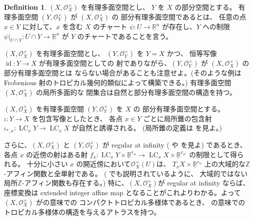 \documentclass[a4paper,dvipdfmx,reqno,12pt]{amsart}
\theoremstyle{definition}
\newtheorem{definition}[theorem]{Definition}
\newcommand{\opn}[1]{\operatorname{#1}}
\numberwithin{equation}{section}
\begin{document}
\begin{definition}

$(X,\mathcal{O}_X^{\times})$ を有理多面空間とし、
$Y$ を $X$ の部分空間とする。
有理多面空間 $(Y,\mathcal{O}_Y^{\times})$ が 
$(X,\mathcal{O}_X^{\times})$ の
部分有理多面空間であるとは、
任意の点 $x\in Y$ に対して、$x$ を含む
$X$ のチャート $\psi \colon U\to \underline{\mathbb{R}}^{n}$
が存在し、$Y$ への制限 
$\psi|_{U\cap Y}\colon U\cap Y \to \underline{\mathbb{R}}^{n}$
が $Y$ のチャートであることを言う。
\end{definition}

$(X,\mathcal{O}_X^{\times})$ を有理多面空間とし、
$(Y,\mathcal{O}_Y^{\times})$ を $Y=X$ かつ、
恒等写像 $\opn{id}\colon Y\to X$ が有理多面空間としての
射でありながら、$(Y,\mathcal{O}_Y^{\times})$ が
$(X,\mathcal{O}_X^{\times})$ の部分有理多面空間とは
ならない場合があることも注意せよ。(そのような例は
Frobenious 射のトロピカル幾何的類似によって構築できる。)
有理多面空間 $(X,\mathcal{O}_X^{\times})$ の局所多面的な
閉集合は自然と部分有理多面空間の構造を持つ。

$(X,\mathcal{O}_X^{\times})$ を有理多面空間
$(Y,\mathcal{O}_Y^{\times})$ を $X$ の
部分有理多面空間とする。
$\iota\colon Y \to X$ を包含写像としたとき、
各点 $x\in Y$ ごとに局所錐の包含射
$\iota_{*,x}\colon \opn{LC}_x Y\to \opn{LC}_x X$
が自然と誘導される。
(局所錐の定義は\cite[]{MR4637248}
を見よ。)

さらに、$(X,\mathcal{O}_X^{\times})$ と
$(Y,\mathcal{O}_Y^{\times})$ が
regular at infinity 
(\cite[]{MR4637248} や
\cite[Definition 1.2]{MR3330789} を見よ) 
であるとき、各点 $x$ の近傍の射はある射
$f_{x}\colon \opn{LC}_x Y\times 
\underline{\mathbb{R}}^{r_{\alpha}}
\to \opn{LC}_x X\times \underline{\mathbb{R}}^{r_{\alpha'}}$
の制限として得られる。
十分に小さい $x$
の開近傍において$\mathcal{O}_X^{\times}(U)$は、
$T_x X\times \underline{\mathbb{R}}^{r_{\alpha}}$
上の大域的な$\mathbb{Z}$-アフィン関数と全単射である。
(\cite[Example 2.1]{MR4637248} でも説明されているように、
大域的ではない局所$\mathbb{Z}$-アフィン関数も存在する。)
特に、$(X,\mathcal{O}_X^{\times})$が regular at infinity
ならば、座標変換は
extended integer affine map \cite[Definition 2.2]{demedrano2023chern}
となることがこれよりわかる。よって
$(X,\mathcal{O}_X^{\times})$ 
が\cite[Definition 6.1]{gross2019sheaftheoretic}の意味での
コンパクトトロピカル多様体であるとき、
\cite[Definition 2.3]{demedrano2023chern}
の意味でのトロピカル多様体の構造を与えるアトラスを持つ。
\end{document}
